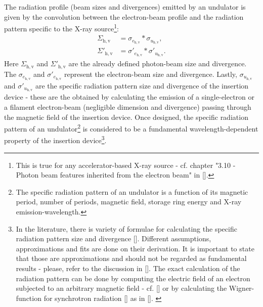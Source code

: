 \begin{refsection}
The radiation profile (beam sizes and divergences) emitted by an undulator is given by the convolution between the electron-beam profile and the radiation pattern specific to the X-ray source\footnote{This is true for any accelerator-based X-ray source - cf. chapter "3.10 - Photon beam features inherited from the electron beam" in [\cite{Talman2006}].}: 
\begin{subequations}\label{eq:undulator}
    \begin{align}   
    \Sigma_{\mathrm{h,v}} &= \sigma_{e_{\mathrm{h,v}}}*\sigma_{u_{\mathrm{h,v}}},\\
    \Sigma'_{\mathrm{h,v}} &= \sigma'_{e_{\mathrm{h,v}}}*\sigma'_{u_{\mathrm{h,v}}}.
    \end{align}
\end{subequations}{}
Here $\Sigma_{\mathrm{h,v}}$ and $\Sigma'_{\mathrm{h,v}}$ are the already defined photon-beam size and divergence. The $\sigma_{e_{\mathrm{h,v}}}$ and $\sigma'_{e_{\mathrm{h,v}}}$ represent the electron-beam size and divergence. Lastly, $\sigma_{u_{\mathrm{h,v}}}$ and $\sigma'_{u_{\mathrm{h,v}}}$ are the specific radiation pattern size and divergence of the insertion device - these are the obtained by calculating the emission of a single-electron or a filament electron-beam (negligible dimension and divergence) passing through the magnetic field of the insertion device. Once designed, the specific radiation pattern of an undulator\footnote{The specific radiation pattern of an undulator is a function of its magnetic period, number of periods, magnetic field, storage ring energy and X-ray emission-wavelength.} is considered to be a fundamental wavelength-dependent property of the insertion device\footnote{In the literature, there is variety of formulae for calculating the specific radiation pattern size and divergence [\cite{Kim1986, Kim1989, Tanaka2009, Elleaume2013}]. Different assumptions, approximations and fits are done on their derivation. It is important to state that those are approximations and should not be regarded as fundamental results - please, refer to the discussion in [\cite{Walker2019}]. The exact calculation of the radiation pattern can be done by computing the electric field of an electron subjected to an arbitrary magnetic field - cf. [\cite{Chubar1995, Chubar2001}] or by calculating the Wigner-function for synchrotron radiation [\cite{Bazarov2012}] as in [\cite{Tanaka2014}]. \label{note:und_prof}}.


\end{refsection}
